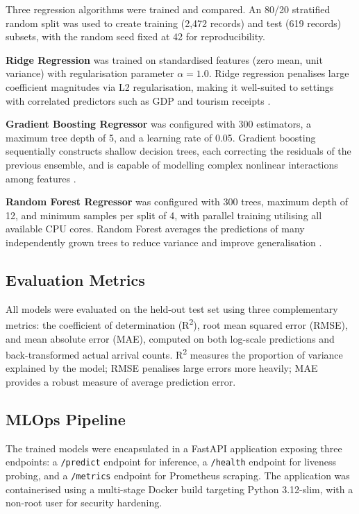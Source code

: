 \documentclass[conference]{IEEEtran}
\begin{document}
Three regression algorithms were trained and compared.
An 80/20 stratified random split was used to create training
(2,472 records) and test (619 records) subsets, with the
random seed fixed at 42 for reproducibility.

\textbf{Ridge Regression} was trained on standardised
features (zero mean, unit variance) with regularisation
parameter $\alpha = 1.0$. Ridge regression penalises
large coefficient magnitudes via L2 regularisation, making
it well-suited to settings with correlated predictors
such as GDP and tourism receipts \cite{hoerl1970}.

\textbf{Gradient Boosting Regressor} was configured with
300 estimators, a maximum tree depth of 5, and a learning
rate of 0.05. Gradient boosting sequentially constructs
shallow decision trees, each correcting the residuals of
the previous ensemble, and is capable of modelling complex
nonlinear interactions among features \cite{friedman2001}.

\textbf{Random Forest Regressor} was configured with 300
trees, maximum depth of 12, and minimum samples per split
of 4, with parallel training utilising all available CPU
cores. Random Forest averages the predictions of many
independently grown trees to reduce variance and improve
generalisation \cite{breiman2001}.

\subsection{Evaluation Metrics}

All models were evaluated on the held-out test set using
three complementary metrics: the coefficient of
determination (R\textsuperscript{2}), root mean squared
error (RMSE), and mean absolute error (MAE), computed on
both log-scale predictions and back-transformed actual
arrival counts. R\textsuperscript{2} measures the
proportion of variance explained by the model; RMSE
penalises large errors more heavily; MAE provides a robust
measure of average prediction error.

\subsection{MLOps Pipeline}

The trained models were encapsulated in a FastAPI
application exposing three endpoints: a \texttt{/predict}
endpoint for inference, a \texttt{/health} endpoint for
liveness probing, and a \texttt{/metrics} endpoint
for Prometheus scraping. The application was containerised
using a multi-stage Docker build targeting Python 3.12-slim,
with a non-root user for security hardening.
\end{document}
